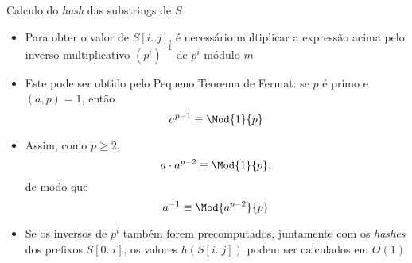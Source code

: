 \begin{frame}[fragile]{Calculo do {\it hash} das substrings de $S$}

    \begin{itemize}
        \item Para obter o valor de $S[i..j]$, é necessário multiplicar a expressão acima
            pelo inverso multiplicativo $(p^i)^{-1}$ de $p^i$ módulo $m$

        \item Este pode ser obtido pelo Pequeno Teorema de Fermat: se $p$ é primo e 
        $(a, p) = 1$, então
        \[
            a^{p-1}\equiv \Mod{1}{p}
        \]

        \item Assim, como $p \geq 2$,
        \[
            a\cdot a^{p-2}\equiv \Mod{1}{p},
        \]
        de modo que 
        \[
            a^{-1}\equiv \Mod{a^{p-2}}{p}
        \]

        \item Se os inversos de $p^i$ também forem precomputados, juntamente com os 
        \textit{hashes} dos prefixos $S[0..i]$, os valores $h(S[i..j])$ podem ser calculados
        em $O(1)$
    \end{itemize}

\end{frame}
